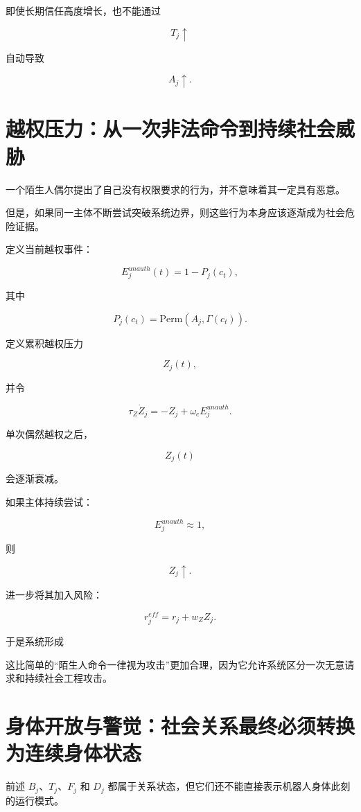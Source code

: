 即使长期信任高度增长，也不能通过

\[
T_j\uparrow
\]

自动导致

\[
A_j\uparrow.
\]


\section{越权压力：从一次非法命令到持续社会威胁}

一个陌生人偶尔提出了自己没有权限要求的行为，并不意味着其一定具有恶意。

但是，如果同一主体不断尝试突破系统边界，则这些行为本身应该逐渐成为社会危险证据。

定义当前越权事件：

\[
E_j^{unauth}(t)
=
1-P_j(c_t),
\]

其中

\[
P_j(c_t)
=
\mathrm{Perm}
\left(
A_j,
\Gamma(c_t)
\right).
\]

定义累积越权压力

\[
Z_j(t),
\]

并令

\[
\boxed{
\tau_Z
\dot Z_j
=
-Z_j
+
\omega_c
E_j^{unauth}.
}
\]

单次偶然越权之后，

\[
Z_j(t)
\]

会逐渐衰减。

如果主体持续尝试：

\[
E_j^{unauth}\approx1,
\]

则

\[
Z_j\uparrow.
\]

进一步将其加入风险：

\[
r_j^{eff}
=
r_j
+
w_ZZ_j.
\]

于是系统形成

\begin{statementbox}
\centering
{}
\end{statementbox}

这比简单的“陌生人命令一律视为攻击”更加合理，因为它允许系统区分一次无意请求和持续社会工程攻击。


\section{身体开放与警觉：社会关系最终必须转换为连续身体状态}

前述 $B_j$、$T_j$、$F_j$ 和 $D_j$ 都属于关系状态，但它们还不能直接表示机器人身体此刻的运行模式。

